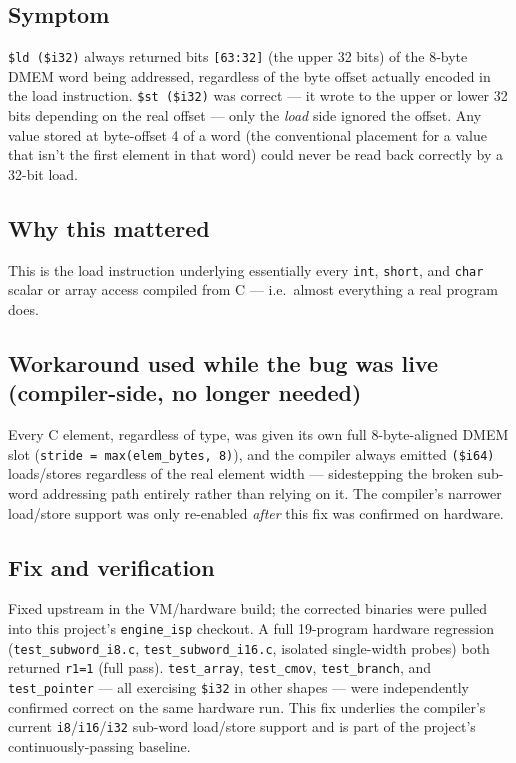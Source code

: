\documentclass[11pt,a4paper]{report}
\begin{document}
\subsection*{Symptom}
\texttt{\$ld (\$i32)} always returned bits \texttt{[63:32]} (the upper 32 bits) of the
8-byte DMEM word being addressed, regardless of the byte offset actually encoded in the
load instruction. \texttt{\$st (\$i32)} was correct --- it wrote to the upper or lower 32
bits depending on the real offset --- only the \emph{load} side ignored the offset. Any
value stored at byte-offset 4 of a word (the conventional placement for a value that isn't
the first element in that word) could never be read back correctly by a 32-bit load.

\subsection*{Why this mattered}
This is the load instruction underlying essentially every \texttt{int}, \texttt{short}, and
\texttt{char} scalar or array access compiled from C --- i.e.\ almost everything a real
program does.

\subsection*{Workaround used while the bug was live (compiler-side, no longer needed)}
Every C element, regardless of type, was given its own full 8-byte-aligned DMEM slot
(\texttt{stride = max(elem\_bytes, 8)}), and the compiler always emitted \texttt{(\$i64)}
loads/stores regardless of the real element width --- sidestepping the broken sub-word
addressing path entirely rather than relying on it. The compiler's narrower load/store
support was only re-enabled \emph{after} this fix was confirmed on hardware.

\subsection*{Fix and verification}
Fixed upstream in the VM/hardware build; the corrected binaries were pulled into this
project's \texttt{engine\_isp} checkout. A full 19-program hardware regression
(\texttt{test\_subword\_i8.c}, \texttt{test\_subword\_i16.c}, isolated single-width probes)
both returned \texttt{r1=1} (full pass). \texttt{test\_array}, \texttt{test\_cmov},
\texttt{test\_branch}, and \texttt{test\_pointer} --- all exercising \texttt{\$i32} in other
shapes --- were independently confirmed correct on the same hardware run. This fix
underlies the compiler's current \texttt{i8}/\texttt{i16}/\texttt{i32} sub-word load/store
support and is part of the project's continuously-passing baseline.
\end{document}
